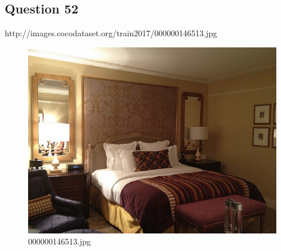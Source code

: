 \subsection*{Question 52}
http://images.cocodataset.org/train2017/000000146513.jpg
\begin{figure}[h]
    \centering
    \includegraphics[width=0.8\linewidth]{../image set/hard/000000146513.jpg}
    \caption{000000146513.jpg}
\end{figure}
